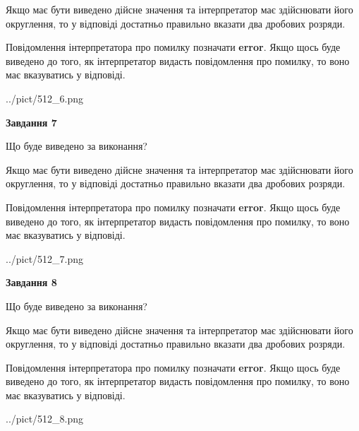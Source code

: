 \documentclass[12pt, ukrainian]{article}
\begin{document}
{\begin {Large}
Якщо має бути виведено дійсне значення та інтерпретатор має здійснювати його округлення, 
то у відповіді достатньо правильно вказати два дробових розряди.

Повідомлення інтерпретатора про помилку позначати \textbf{error}.
Якщо щось буде виведено до того, як інтерпретатор видасть повідомлення про помилку, 
то воно має вказуватись у відповіді. \par

\begin{center}
	{../pict/512_6.png}
\end{center}
\newpage

{\begin {center}\textbf{Завдання 7}\end {center}}\par
Що буде виведено за виконання? \par

Якщо має бути виведено дійсне значення та інтерпретатор має здійснювати його округлення, 
то у відповіді достатньо правильно вказати два дробових розряди.

Повідомлення інтерпретатора про помилку позначати \textbf{error}.
Якщо щось буде виведено до того, як інтерпретатор видасть повідомлення про помилку, 
то воно має вказуватись у відповіді. \par

\begin{center}
	{../pict/512_7.png}
\end{center}
\newpage

{\begin {center}\textbf{Завдання 8}\end {center}}\par
Що буде виведено за виконання? \par

Якщо має бути виведено дійсне значення та інтерпретатор має здійснювати його округлення, 
то у відповіді достатньо правильно вказати два дробових розряди.

Повідомлення інтерпретатора про помилку позначати \textbf{error}.
Якщо щось буде виведено до того, як інтерпретатор видасть повідомлення про помилку, 
то воно має вказуватись у відповіді. \par

\begin{center}
	{../pict/512_8.png}
\end{center}
\newpage


\end{Large}}
\end{document}
